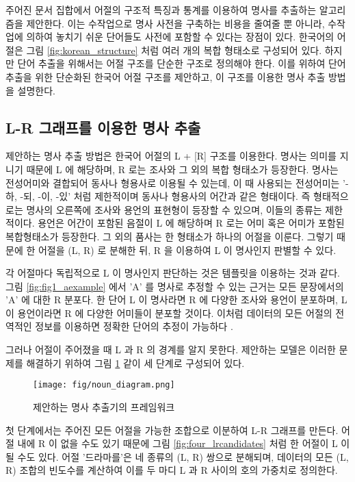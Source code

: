 \documentclass[oneside, ko,phd]{snuthesis_utf8_kor}
\begin{document}
주어진 문서 집합에서 어절의 구조적 특징과 통계를 이용하여 명사를 추출하는 알고리즘을 제안한다.
이는 수작업으로 명사 사전을 구축하는 비용을 줄여줄 뿐 아니라, 수작업에 의하여 놓치기 쉬운 단어들도 사전에 포함할 수 있다는 장점이 있다.
한국어의 어절은 그림 \ref{fig:korean_structure} 처럼 여러 개의 복합 형태소로 구성되어 있다.
하지만 단어 추출을 위해서는 어절 구조를 단순한 구조로 정의해야 한다.
이를 위하여 단어 추출을 위한 단순화된 한국어 어절 구조를 제안하고, 이 구조를 이용한 명사 추출 방법을 설명한다.

\subsection{L-R 그래프를 이용한 명사 추출}

제안하는 명사 추출 방법은 한국어 어절의 L + [R] 구조를 이용한다.
명사는 의미를 지니기 때문에 L 에 해당하며, R 로는 조사와 그 외의 복합 형태소가 등장한다.
명사는 전성어미와 결합되어 동사나 형용사로 이용될 수 있는데, 이 때 사용되는 전성어미는 '-하, -되, -이, -있' 처럼 제한적이며 동사나 형용사의 어간과 같은 형태이다.
즉 형태적으로는 명사의 오른쪽에 조사와 용언의 표현형이 등장할 수 있으며, 이들의 종류는 제한적이다.
용언은 어간이 포함된 음절이 L 에 해당하며 R 로는 어미 혹은 어미가 포함된 복합형태소가 등장한다.
그 외의 품사는 한 형태소가 하나의 어절을 이룬다.
그렇기 때문에 한 어절을 (L, R) 로 분해한 뒤, R 을 이용하여 L 이 명사인지 판별할 수 있다.

각 어절마다 독립적으로 L 이 명사인지 판단하는 것은 템플릿을 이용하는 것과 같다.
그림 \ref{fig:fig1_aexample} 에서 'A' 를 명사로 추정할 수 있는 근거는 모든 문장에서의 'A' 에 대한 R 분포다.
한 단어 L 이 명사라면 R 에 다양한 조사와 용언이 분포하며, L 이 용언이라면 R 에 다양한 어미들이 분포할 것이다.
이처럼 데이터의 모든 어절의 전역적인 정보를 이용하면 정확한 단어의 추정이 가능하다 \cite{zhao2007incorporating}.

그러나 어절이 주어졌을 때 L 과 R 의 경계를 알지 못한다.
제안하는 모델은 이러한 문제를 해결하기 위하여 그림 \ref{fig:noun_diagram} 같이 세 단계로 구성되어 있다.

\begin{figure}[ht]
\centering
\texttt{[image: fig/noun\_diagram.png]}
\caption{제안하는 명사 추출기의 프레임워크}
\label{fig:noun_diagram}
\end{figure}

첫 단계에서는 주어진 모든 어절을 가능한 조합으로 이분하여 L-R 그래프를 만든다.
어절 내에 R 이 없을 수도 있기 때문에 그림 \ref{fig:four_lrcandidates} 처럼 한 어절이 L 이 될 수도 있다.
어절 '드라마를'은 네 종류의 (L, R) 쌍으로 분해되며, 데이터의 모든 (L, R) 조합의 빈도수를 계산하여 이를 두 마디 L 과 R 사이의 호의 가중치로 정의한다.
\end{document}
